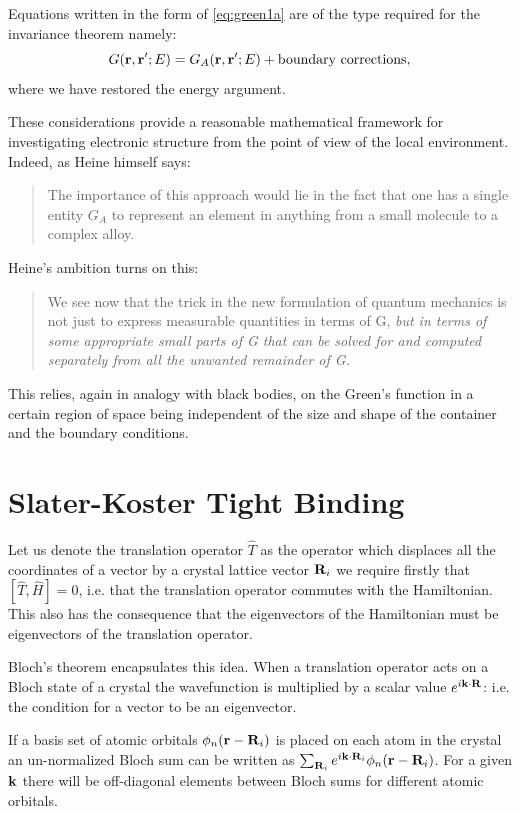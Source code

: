 Equations written in the form of \ref{eq:green1a} are of the type required for the invariance theorem namely:
%
\begin{equation}
G({\bf r},{\bf r}';E) = G_{A}({\bf r},{\bf r}';E) + {\rm boundary ~ corrections},
\end{equation}
%
where we have restored the energy argument.

These considerations provide a reasonable mathematical framework for 
investigating electronic structure from the point of view of the local environment.
Indeed, as Heine himself says: 

\begin{quote}
The importance of this approach would lie in the fact that
one has a single entity $G_{A}$ to represent an element in anything 
from a small molecule to a complex alloy.
\end{quote}

%
Heine's ambition turns on this:
%
\begin{quote}
We see now that the trick in the new formulation of quantum 
mechanics is not just to express measurable quantities in terms of 
G, {\it but in terms of some appropriate small parts of G that can be solved 
for and computed separately from all the unwanted remainder of G.}
\end{quote}
%
This relies, again in analogy with black bodies, on the Green's
function in a certain region of space being independent of the size and shape
of the container and the boundary conditions.

\section{Slater-Koster Tight Binding}
Let us denote the translation operator $\hat{T}$
as the operator which displaces all the coordinates of a vector 
by a crystal lattice vector ${\bf R}_{i}$ we require 
firstly that $[\hat{T},\hat{H}]=0$, i.e. that the 
translation operator commutes with the Hamiltonian. This also
has the consequence that the eigenvectors of the Hamiltonian
must be eigenvectors of the translation operator. 

Bloch's theorem encapsulates this idea. When a translation operator acts 
on a Bloch state of a crystal the wavefunction is multiplied by a scalar
value $e^{i{\bf k}\cdot{\bf R}}$: i.e. the condition for a vector to be an
eigenvector.

If a basis set of atomic orbitals $\phi_{n}({\bf r}-{\bf R}_{i})$
is placed on each atom in the crystal an un-normalized Bloch sum can be 
written as $\sum_{{\bf R}_{i}} e^{i{\bf k}\cdot{\bf R}_{i}}\phi_{n}({\bf r}-{\bf R}_{i})$. For
a given ${\bf k}$ there will be off-diagonal elements between Bloch sums
for different atomic orbitals.


